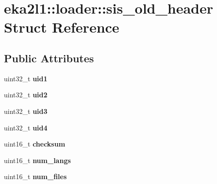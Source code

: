 \hypertarget{structeka2l1_1_1loader_1_1sis__old__header}{}\section{eka2l1\+:\+:loader\+:\+:sis\+\_\+old\+\_\+header Struct Reference}
\label{structeka2l1_1_1loader_1_1sis__old__header}
\subsection*{Public Attributes}
\begin{DoxyCompactItemize}
\item 
\mbox{\label{structeka2l1_1_1loader_1_1sis__old__header_a7c128e767bdde6a1d69d3085b7c6d90f}} 
uint32\+\_\+t {\bfseries uid1}
\item 
\mbox{\label{structeka2l1_1_1loader_1_1sis__old__header_adc4c56781fc8dc5a042b0dc1df7c4c14}} 
uint32\+\_\+t {\bfseries uid2}
\item 
\mbox{\label{structeka2l1_1_1loader_1_1sis__old__header_a7a11ac85c6c8736b00389c729b01714e}} 
uint32\+\_\+t {\bfseries uid3}
\item 
\mbox{\label{structeka2l1_1_1loader_1_1sis__old__header_a8245828f1120435f29913f1460607190}} 
uint32\+\_\+t {\bfseries uid4}
\item 
\mbox{\label{structeka2l1_1_1loader_1_1sis__old__header_afac397139a97248e5c3bbe24efdb73bc}} 
uint16\+\_\+t {\bfseries checksum}
\item 
\mbox{\label{structeka2l1_1_1loader_1_1sis__old__header_a7154df1d0029c3c8fe192c4235fdb08b}} 
uint16\+\_\+t {\bfseries num\+\_\+langs}
\item 
\mbox{\label{structeka2l1_1_1loader_1_1sis__old__header_aabd80d90f09168d1d9d51a2385ba3545}} 
uint16\+\_\+t {\bfseries num\+\_\+files}
\item 

\end{DoxyCompactItemize}
